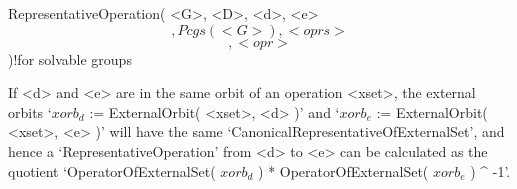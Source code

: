 \>RepresentativeOperation( <G>, <D>, <d>, <e> \[, {Pcgs( <G> )}, <oprs> %
                           \] \[, <opr> \] )!{for solvable groups}

If <d> and <e> are in the same orbit of an operation <xset>, the external
orbits `$xorb_d$    := ExternalOrbit( <xset>,  <d>   )'  and `$xorb_e$ :=
ExternalOrbit(      <xset>,     <e>    )'     will     have    the   same
`CanonicalRepresentativeOfExternalSet',        and    hence             a
`RepresentativeOperation'  from   <d> to <e>   can be  calculated  as the
quotient `OperatorOfExternalSet(  $xorb_d$  )    * OperatorOfExternalSet(
$xorb_e$ ) ^ -1'.

